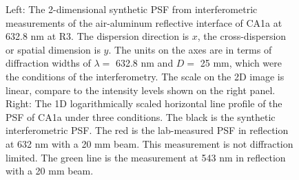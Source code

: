 \begin{figure}
\begin{center}
  \end{center}
  \caption[Immersion grating interferogram PSF]{\label{fig:PSFzygo}  Left: The 2-dimensional synthetic PSF from interferometric measurements of the air-aluminum reflective interface of CA1a at 632.8 nm at R3.  The dispersion direction is $x$, the cross-dispersion or spatial dimension is $y$.  The units on the axes are in terms of diffraction widths of $\lambda=$ 632.8 nm and $D=$ 25 mm, which were the conditions of the interferometry.  The scale on the 2D image is linear, compare to the intensity levels shown on the right panel.  Right:  The 1D logarithmically scaled horizontal line profile of the PSF of CA1a under three conditions.  The black is the synthetic interferometric PSF.  The red is the lab-measured PSF in reflection at 632 nm with a 20 mm beam.  This measurement is not diffraction limited.  The green line is the measurement at 543 nm in reflection with a 20 mm beam.}
\end{figure}


